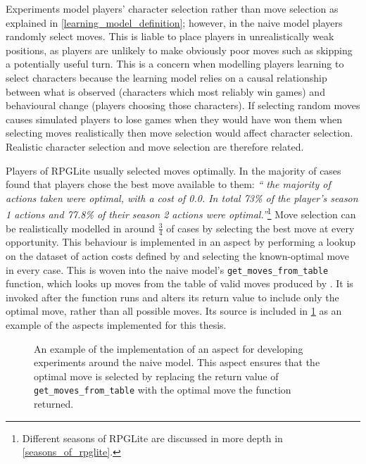 

Experiments model players' character selection rather than move selection as
explained in \cref{learning_model_definition}; however, in the naive model
players randomly select moves. This is liable to place players in
unrealistically weak positions, as players are unlikely to make obviously poor
moves such as skipping a potentially useful turn. This is a concern when
modelling players learning to select characters because the learning model
relies on a causal relationship between what is observed (characters which most
reliably win games) and behavioural change (players choosing those characters).
If selecting random moves causes simulated players to lose games when they would
have won them when selecting moves realistically then move selection would
affect character selection. Realistic character selection and move selection are
therefore related.

Players of RPGLite usually selected moves optimally. In the majority of cases
\citet{kavanagh2021gameplay} found that players chose the best move available to
them: \emph{``\textelp{} the majority of actions taken were optimal, with a cost of
0.0. In total 73\% of the player's season 1 actions and 77.8\% of their season 2
actions were optimal.''}\footnote{Different seasons of RPGLite are discussed in
more depth in \cref{seasons_of_rpglite}.} Move selection can be realistically
modelled in around \(\frac{3}{4}\) of cases by selecting the best move at every
opportunity. This behaviour is implemented in an aspect by performing a lookup on
the dataset of action costs defined by \citet{kavanagh2021gameplay} and
selecting the known-optimal move in every case. This is woven into the naive
model's \lstinline{get_moves_from_table} function, which looks up moves from the
table of valid moves produced by \citet{kavanagh2021thesis}. It is invoked after
the function runs and alters its return value to include only the optimal move,
rather than all possible moves. Its source is included in
\cref{fig:best_move_aspect_source} as an example of the aspects implemented for this
thesis.

\begin{figure}[h]
  \centering
  
  \caption{An example of the implementation of an aspect for developing
  experiments around the naive model. This aspect ensures that the optimal move
  is selected by replacing the return value of \lstinline{get_moves_from_table}
  with the optimal move the function returned.}
  \label{fig:best_move_aspect_source}
\end{figure}

